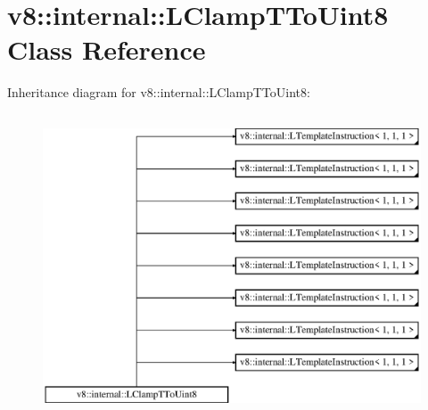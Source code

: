 \hypertarget{classv8_1_1internal_1_1_l_clamp_t_to_uint8}{}\section{v8\+:\+:internal\+:\+:L\+Clamp\+T\+To\+Uint8 Class Reference}
\label{classv8_1_1internal_1_1_l_clamp_t_to_uint8}
Inheritance diagram for v8\+:\+:internal\+:\+:L\+Clamp\+T\+To\+Uint8\+:\begin{figure}[H]
\begin{center}
\leavevmode
\includegraphics[height=9.000000cm]{classv8_1_1internal_1_1_l_clamp_t_to_uint8}
\end{center}
\end{figure}
